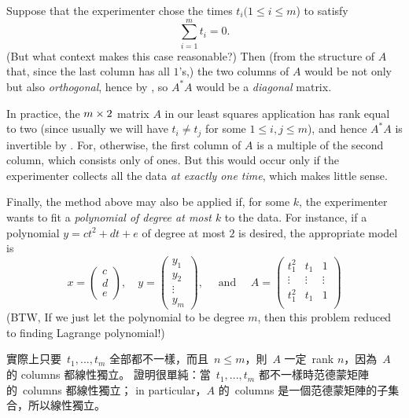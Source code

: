Suppose that the experimenter chose the times \(t_i (1 \le i \le m\)) to satisfy
\[
    \sum_{i = 1}^m t_i = 0.
\]
(But what context makes this case reasonable?)
Then (from the structure of \(A\) that, since the last column has all \(1\)'s,) the two columns of \(A\) would be not only \LID{} but also \emph{orthogonal}, hence by , so \(A^*A\) would be a \emph{diagonal} matrix.

In practice, the \(m \times 2\) matrix \(A\) in our least squares application has rank equal to two (since usually we will have \(t_i \ne t_j\) for some \(1 \le i, j \le m\)), and hence \(A^* A\) is invertible by .
For, otherwise, the first column of \(A\) is a multiple of the second column, which consists only of ones.
But this would occur only if the experimenter collects all the data \emph{at exactly one time}, which makes little sense.

Finally, the method above may also be applied if, for some \(k\), the experimenter wants to fit a \emph{polynomial of degree at most \(k\)} to the data.
For instance, if a polynomial \(y = ct^2 + dt + e\) of degree at most \(2\) is desired, the appropriate model is
\[
    x = \begin{pmatrix} c \\ d \\ e \end{pmatrix}, \quad 
    y = \begin{pmatrix} y_1 \\ y_2 \\ \vdots \\ y_m \end{pmatrix}, \quad \text{ and } \quad
    A = \begin{pmatrix}
        t_1^2 & t_1 & 1 \\
        \vdots & \vdots & \vdots \\ 
        t_1^2 & t_1 & 1 \\
    \end{pmatrix}
\]
(BTW, If we just let the polynomial to be degree \(m\), then this problem reduced to finding Lagrange polynomial!)

\begin{note}
實際上只要\ \(t_1, ..., t_m\) 全部都不一樣，而且\ \(n \le m\)，則\ \(A\) 一定\ rank \(n\)，因為\ \(A\) 的 columns 都線性獨立。
證明很單純：當\ \(t_1, ..., t_m\) 都不一樣時范德蒙矩陣的\ columns 都線性獨立；
in particular，\(A\) 的\ columns 是一個范德蒙矩陣的子集合，所以線性獨立。
\end{note}

